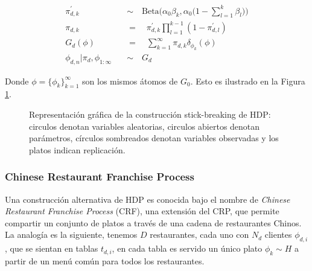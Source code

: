 \documentclass[letterpaper,12pt,oneside]{book} %
\begin{document}
\begin{align}
    \pi_{d,k}^{'} \quad &\sim \quad \text{Beta}\big(\alpha_{0}\beta_{k}, \alpha_{0}\big(1-\sum_{l=1}^{k}\beta_{l}\big)\big)\\
    \pi_{d,k} \quad &= \quad \pi_{d,k}^{'}\prod_{l=1}^{k-1}(1-\pi_{d,l}^{'})\\
    G_{d}(\phi) \quad &= \quad\sum_{k=1}^{\infty}\pi_{d,k}\delta_{\phi_{k}}(\phi)\\
    \phi_{d,n}|\pi_{d}, \phi_{1:\infty} \quad &\sim \quad G_{d}
\end{align}

Donde $\phi = \{\phi_{k}\}_{k=1}^{\infty}$ son los mismos átomos de $G_{0}$. Esto es ilustrado en la Figura \ref{img:hdp_sbc}.

\begin{figure}
  \centering
\caption{Representación gráfica de la construcción stick-breaking de HDP: circulos denotan variables aleatorias, circulos abiertos denotan parámetros, círculos sombreados denotan variables observadas y los platos indican replicación.}
\label{img:hdp_sbc}
\end{figure}

\subsubsection{Chinese Restaurant Franchise Process}
Una construcción alternativa de HDP es conocida bajo el nombre de \textit{Chinese Restaurant Franchise Process} (CRF), una extensión del CRP, que permite compartir un conjunto de platos a través de una cadena de restaurantes Chinos. La analogía es la siguiente, tenemos $D$ restaurantes, cada uno con $N_{d}$ clientes $\phi_{d,i}$, que se sientan en tablas $t_{d,i}$, en cada tabla es servido un único plato $\phi_{k}\sim H$ a partir de un menú común para todos los restaurantes. \\
\end{document}
